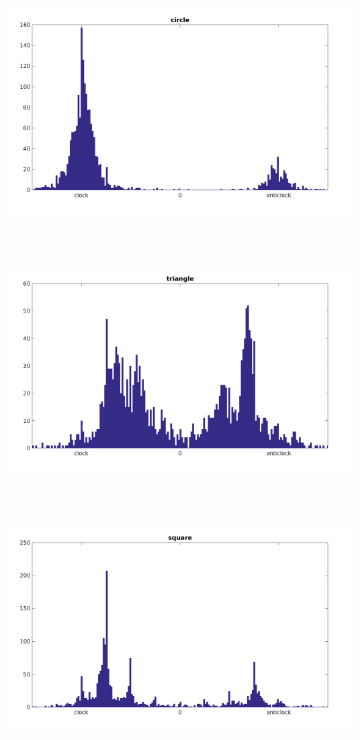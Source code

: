 \begin{figure}
    \centering
    \begin{subfigure}{0.4\textwidth}
        \includegraphics[scale=0.2]{images/dataset/quickdraw_cir_rond.png}
    \end{subfigure}
    ~
    \begin{subfigure}{0.4\textwidth}
        \includegraphics[scale=0.2]{images/dataset/quickdraw_tri_rond.png}
    \end{subfigure}
    ~
    \begin{subfigure}{0.4\textwidth}
        \includegraphics[scale=0.2]{images/dataset/quickdraw_sq_rond.png}

\end{subfigure}
\end{figure}
